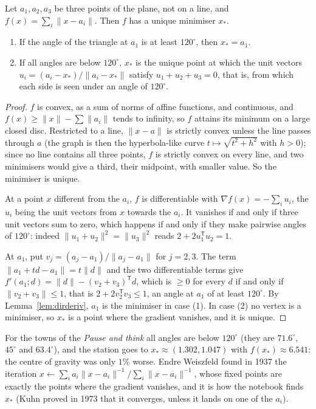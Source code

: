 \begin{theorem}\label{thm:fermat}
Let $a_1,a_2,a_3$ be three points of the plane, not on a line, and $f(x)=\sum_i\|x-a_i\|$. Then $f$ has a unique minimiser $x_*$.
\begin{enumerate}
\item If the angle of the triangle at $a_1$ is at least $120^\circ$, then $x_*=a_1$.
\item If all angles are below $120^\circ$, $x_*$ is the unique point at which the unit vectors $u_i=(a_i-x_*)/\|a_i-x_*\|$ satisfy $u_1+u_2+u_3=0$, that is, from which each side is
seen under an angle of $120^\circ$.
\end{enumerate}
\end{theorem}
\begin{proof}
$f$ is convex, as a sum of norms of affine functions, and continuous, and $f(x)\ge\|x\|-\sum\|a_i\|$ tends to infinity, so $f$ attains its minimum on a large closed disc. Restricted to a
line, $\|x-a\|$ is strictly convex unless the line passes through $a$ (the graph is then the hyperbola-like curve $t\mapsto\sqrt{t^2+h^2}$ with $h>0$); since no line contains all three
points, $f$ is strictly convex on every line, and two minimisers would give a third, their midpoint, with smaller value. So the minimiser is unique.

At a point $x$ different from the $a_i$, $f$ is differentiable with $\nabla f(x)=-\sum_iu_i$, the $u_i$ being the unit vectors from $x$ towards the $a_i$. It vanishes if and
only if three unit vectors sum to zero, which happens if and only if they make pairwise angles of $120^\circ$: indeed $\|u_1+u_2\|^2=\|u_3\|^2$ reads $2+2u_1^{\mathsf T}u_2=1$.

At $a_1$, put $v_j=(a_j-a_1)/\|a_j-a_1\|$ for $j=2,3$. The term $\|a_1+td-a_1\|=t\|d\|$ and the two differentiable terms give $f'(a_1;d)=\|d\|-(v_2+v_3)^{\mathsf T}d$, which is
$\ge0$ for every $d$ if and only if $\|v_2+v_3\|\le1$, that is $2+2v_2^{\mathsf T}v_3\le1$, an angle at $a_1$ of at least $120^\circ$. By Lemma~\ref{lem:dirderiv}, $a_1$ is the minimiser in case (1).
In case (2) no vertex is a minimiser, so $x_*$ is a point where the gradient vanishes, and it is unique.
\end{proof}

For the towns of the \emph{Pause and think} all angles are below $120^\circ$ (they are $71.6^\circ$, $45^\circ$ and $63.4^\circ$), and the station goes to
$x_*\approx(1.302,1.047)$ with $f(x_*)\approx6.541$: the centre of gravity was only $1\%$ worse. Endre Weiszfeld found in 1937 the iteration
$x\leftarrow\sum_ia_i\|x-a_i\|^{-1}/\sum_i\|x-a_i\|^{-1}$, whose fixed points are exactly the points where the gradient vanishes, and it is how the notebook finds $x_*$
(Kuhn proved in 1973 that it converges, unless it lands on one of the $a_i$).

